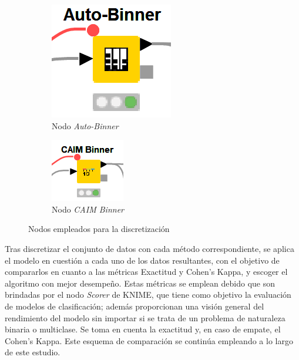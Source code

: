 \begin{figure}[H]
	\centering
	\begin{subfigure}[b]{0.25\linewidth}
		\centering
		\includegraphics[width=0.5\linewidth]{"figuras/capi 2/auto-binner-nodo"}
		\caption{Nodo \textit{Auto-Binner}}
		\label{fig:auto-binner-nodo}
	\end{subfigure}
	\hspace{1.5cm}
	\begin{subfigure}[b]{0.25\linewidth}
		\centering
		\includegraphics[width=0.5\linewidth]{"figuras/capi 2/caim-binner-nodo"}
		\caption{Nodo \textit{CAIM Binner}}
		\label{fig:caim-binner-nodo}
	\end{subfigure}
	\caption{Nodos empleados para la discretización}
	\label{fig:discretizacion-nodos}
\end{figure}

Tras discretizar el conjunto de datos con cada método correspondiente, se aplica el modelo en cuestión a cada uno de los datos resultantes, con el objetivo de compararlos en cuanto a las métricas Exactitud y Cohen's Kappa, y escoger el algoritmo con mejor desempeño. Estas métricas se emplean debido que son brindadas por el nodo \textit{Scorer} de KNIME, que tiene como objetivo la evaluación de modelos de clasificación; además proporcionan una visión general del rendimiento del modelo sin importar si se trata de un problema de naturaleza binaria o multiclase. Se toma en cuenta la exactitud y, en caso de empate, el Cohen's Kappa. Este esquema de comparación se continúa empleando a lo largo de este estudio.

